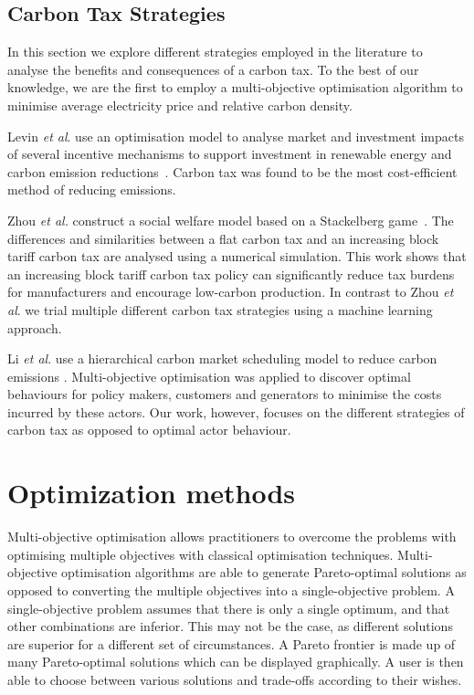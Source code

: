 \documentclass[sigconf]{acmart}
\begin{document}
\subsection{Carbon Tax Strategies}

In this section we explore different strategies employed in the literature to analyse the benefits and consequences of a carbon tax. To the best of our knowledge, we are the first to employ a multi-objective optimisation algorithm to minimise average electricity price and relative carbon density.

Levin \textit{et al}. use an optimisation model to analyse market and investment impacts of several incentive mechanisms to support investment in renewable energy and carbon emission reductions~\cite{Levin2019}. Carbon tax  was found to be the most cost-efficient method of reducing emissions.

Zhou \textit{et al.} construct a social welfare model based on a Stackelberg game~\cite{Zhou2019}. The differences and similarities between a flat carbon tax and an increasing block tariff carbon tax are analysed using a numerical simulation. This work shows that an increasing block tariff carbon tax policy can significantly reduce tax burdens for manufacturers and encourage low-carbon production. In contrast to Zhou \textit{et al}. we trial multiple different carbon tax strategies using a machine learning approach. 

Li \textit{et al}. use a hierarchical carbon market scheduling model to reduce carbon emissions \cite{Li2017}. Multi-objective optimisation was applied to discover optimal behaviours for policy makers, customers and generators to minimise the costs incurred by these actors. Our work, however, focuses on the different strategies of carbon tax as opposed to optimal actor behaviour.



\section{Optimization methods}
\label{sec:optimization_methods}

Multi-objective optimisation allows practitioners to overcome the problems with optimising multiple objectives with classical optimisation techniques. Multi-objective optimisation algorithms are able to generate Pareto-optimal solutions as opposed to converting the multiple objectives into a single-objective problem. A single-objective problem assumes that there is only a single optimum, and that other combinations are inferior. This may not be the case, as different solutions are superior for a different set of circumstances. A Pareto frontier is made up of many Pareto-optimal solutions which can be displayed graphically. A user is then able to choose between various solutions and trade-offs according to their wishes.
\end{document}
